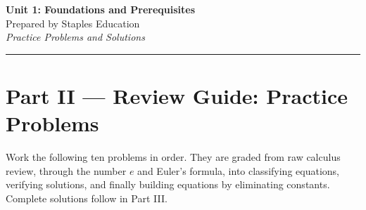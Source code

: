 \documentclass[11pt]{article}
\begin{document}
\begin{center}
    {\LARGE \bfseries Unit 1: Foundations and Prerequisites}\\[6pt]
    {\large Prepared by Staples Education}\\[4pt]
    {\itshape Practice Problems and Solutions}
\end{center}

\vspace{0.6em}
\hrule
\vspace{0.6em}

\section*{Part II --- Review Guide: Practice Problems}

Work the following ten problems in order. They are graded from raw calculus
review, through the number $e$ and Euler's formula, into classifying equations,
verifying solutions, and finally building equations by eliminating constants.
Complete solutions follow in Part III.
\end{document}
